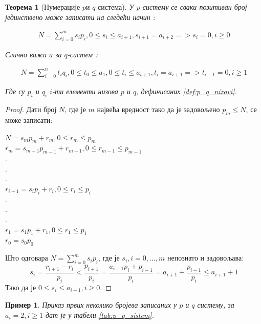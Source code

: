 \documentclass[a4paper]{article}
\newtheorem{example}{Пример}
\newtheorem{theorem}{Теорема}
\begin{document}
\begin{theorem}[Нумерације $ p $и $ q $ система]
	\label{thm:p_q_sistemi}
	У $ p $-систему се сваки позитиван број јединствено може записати на следећи начин :
	
	\begin{eqnarray}
		N = \sum_{i=0}^{m} s_{i}p_{i}, 0 \le s_{i} \le a_{i+1}, s_{i+1} = a_{i+2} => s_{i}=0 , i \ge 0
	\end{eqnarray}
	
	Слично важи и за $ q $-систем :
	
	\begin{eqnarray}
		N = \sum_{i=0}^{n} t_{i}q_{i}, 0 \le t_{0} \le a_{1}, 0 \le t_{i} \le a_{i+1}, t_{i} = a_{i+1} => t_{i-1}=0 , i \ge 1
	\end{eqnarray}
	
	Где су $ p_{i} $ и $ q_{i} $ $ i $-ти елементи низова $ p $ и $ q $, дефинисаних \ref{def:p_q_nizovi}.
\end{theorem} 

\begin{proof}
	Дати број $ N $, где је $ m $ највећа вредност тако да је задовољено $ p_{m} \leq N $, се може записати:
	\begin{center}
		$ N = s_{m}p_{m} + r_{m}, 0 \leq r_{m} \le p_{m} $\\
		$ r_{m} = s_{m-1}p_{m-1} + r_{m-1}, 0 \leq r_{m-1} \le p_{m-1} $\\
		$ . $\\
		$ . $\\
		$ . $\\
		$ r_{i+1} = s_{i}p_{i} + r_{i}, 0 \leq r_{i} \le p_{i} $\\
		$ . $\\
		$ . $\\
		$ . $\\
		$ r_{1} = s_{1}p_{1} + r_{1}, 0 \leq r_{1} \le p_{1} $\\
		$ r_{0} = s_{0}p_{0} $
	\end{center}
	Што одговара $ N = \sum_{i=0}^{m} s_{i}p_{i} $, где је $ s_{i}, i={0, ..., m} $ непознато и задовољава:
	\begin{displaymath}
		s_{i} = \frac{r_{i+1} - r_{i}}{p_{i}} < \frac{p_{i+1}}{p_{i}} = \frac{a_{i+1}p_{i}+p_{i-1}}{p_{i}} = a_{i+1} + \frac{p_{i-1}}{p_{i}} \leq a_{i+1} + 1 
	\end{displaymath}  
	Тако да је $ 0 \leq s_{i} \leq a_{i+1}, i \geq 0 $.
\end{proof}

\begin{example}
	Приказ првих неколико бројева записаних у $ p $ и $ q $ систему, за $ a_{i} = 2 , i \ge 1 $ дат је у табели \ref{tab:p_q_sistem}.
\end{example}
\end{document}
